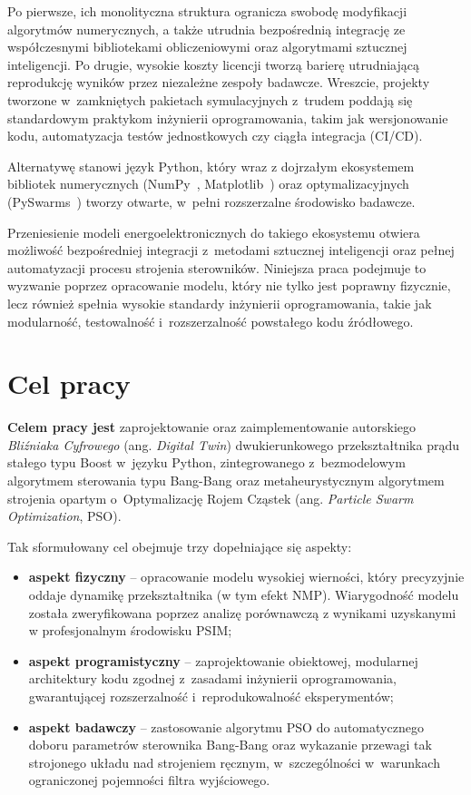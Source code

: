 Po pierwsze, ich monolityczna struktura ogranicza swobodę modyfikacji algorytmów numerycznych, a także utrudnia bezpośrednią integrację ze współczesnymi bibliotekami obliczeniowymi oraz algorytmami sztucznej inteligencji. Po drugie, wysokie koszty licencji tworzą barierę utrudniającą reprodukcję wyników przez niezależne zespoły badawcze. Wreszcie, projekty tworzone w~zamkniętych pakietach symulacyjnych z~trudem poddają się standardowym praktykom inżynierii oprogramowania, takim jak wersjonowanie kodu, automatyzacja testów jednostkowych czy ciągła integracja (CI/CD).

Alternatywę stanowi język Python, który wraz z dojrzałym ekosystemem bibliotek numerycznych (NumPy~\cite{harris2020numpy}, Matplotlib~\cite{hunter2007matplotlib}) oraz optymalizacyjnych (PySwarms~\cite{miranda2018pyswarms}) tworzy otwarte, w~pełni rozszerzalne środowisko badawcze.

Przeniesienie modeli energoelektronicznych do takiego ekosystemu otwiera możliwość bezpośredniej integracji z~metodami sztucznej inteligencji oraz pełnej automatyzacji procesu strojenia sterowników. Niniejsza praca podejmuje to wyzwanie poprzez opracowanie modelu, który nie tylko jest poprawny fizycznie, lecz również spełnia wysokie standardy inżynierii oprogramowania, takie jak modularność, testowalność i~rozszerzalność powstałego kodu źródłowego.

\section{Cel pracy}
\label{sec:cel}

\textbf{Celem pracy jest} zaprojektowanie oraz zaimplementowanie autorskiego \emph{Bliźniaka Cyfrowego} (ang. \emph{Digital Twin}) dwukierunkowego przekształtnika prądu stałego typu Boost w~języku Python, zintegrowanego z~bezmodelowym algorytmem sterowania typu Bang-Bang oraz metaheurystycznym algorytmem strojenia opartym o~Optymalizację Rojem Cząstek (ang. \emph{Particle Swarm Optimization}, PSO).

Tak sformułowany cel obejmuje trzy dopełniające się aspekty:

\begin{itemize}
	\item \textbf{aspekt fizyczny} -- opracowanie modelu wysokiej wierności, który precyzyjnie oddaje dynamikę przekształtnika (w tym efekt NMP). Wiarygodność modelu została zweryfikowana poprzez analizę porównawczą z wynikami uzyskanymi w profesjonalnym środowisku PSIM;
	\item \textbf{aspekt programistyczny} -- zaprojektowanie obiektowej, modularnej architektury kodu zgodnej z~zasadami inżynierii oprogramowania, gwarantującej rozszerzalność i~reprodukowalność eksperymentów;
	\item \textbf{aspekt badawczy} -- zastosowanie algorytmu PSO do automatycznego doboru parametrów sterownika Bang-Bang oraz wykazanie przewagi tak strojonego układu nad strojeniem ręcznym, w~szczególności w~warunkach ograniczonej pojemności filtra wyjściowego.
\end{itemize}

